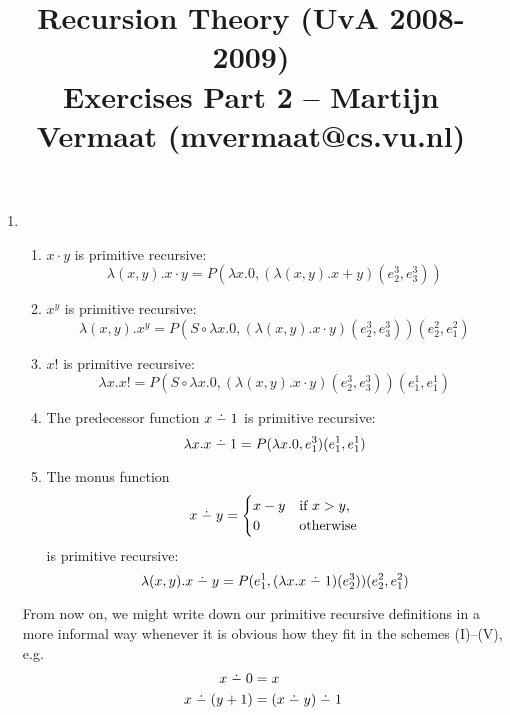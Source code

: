 \documentclass[a4paper,11pt]{article}
\title{Recursion Theory (UvA 2008-2009)\\
\normalsize{Exercises Part 2 -- Martijn Vermaat (mvermaat@cs.vu.nl)}}
\date{}
\newcommand{\dotmin}{\buildrel\textstyle.\over{\hbox{\vrule height3pt depth0pt width0pt}{\smash-}}}
\begin{document}
\maketitle


\begin{enumerate}


\item %
\begin{enumerate}
\item $x \cdot y$ is primitive recursive:
\begin{equation*}
  \lambda (x, y). x \cdot y = P(\lambda x.0,
                                (\lambda (x, y). x + y) (e^3_2, e^3_3))
\end{equation*}

\item $x^y$ is primitive recursive:
\begin{equation*}
  \lambda (x, y). x^y = P(S \circ \lambda x.0,
                          (\lambda (x, y). x \cdot y) (e^3_2, e^3_3)) (e^2_2, e^2_1)
\end{equation*}

\item $x!$ is primitive recursive:
\begin{equation*}
  \lambda x.x! = P(S \circ \lambda x.0,
                   (\lambda (x, y). x \cdot y) (e^3_2, e^3_3)) (e^1_1, e^1_1)
\end{equation*}

\item The predecessor function $x \dotmin 1$ is primitive recursive:
\begin{equation*}
  \lambda x.x \dotmin 1 = P(\lambda x.0,
                            e^3_1) (e^1_1, e^1_1)
\end{equation*}

\item The monus function
\begin{equation*}
  x \dotmin y =
  \begin{cases}
    x - y & \text{if $x > y$,}\\
    0     & \text{otherwise}
  \end{cases}
\end{equation*}
is primitive recursive:
\begin{equation*}
  \lambda (x, y).x \dotmin y = P(e^1_1, (\lambda x.x \dotmin 1) (e^3_2)) (e^2_2, e^2_1)
\end{equation*}
\end{enumerate}

From now on, we might write down our primitive recursive definitions in a more
informal way whenever it is obvious how they fit in the schemes (I)--(V), e.g.
\begin{align*}
  x \dotmin 0       &= x\\
  x \dotmin (y + 1) &= (x \dotmin y) \dotmin 1
\end{align*}


\end{enumerate}
\end{document}
